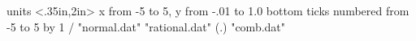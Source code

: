 %
%
\beginpicture
  \setcoordinatesystem units <.35in,2in>
  \setplotarea x from -5 to 5, y from -.01 to 1.0
  \axis bottom  
    ticks numbered from -5 to 5 by 1 /
 \setquadratic
 \plot "normal.dat" 
 \plot "rational.dat" 
 \setplotsymbol({\rm .})
 \plot "comb.dat" 
\endpicture
